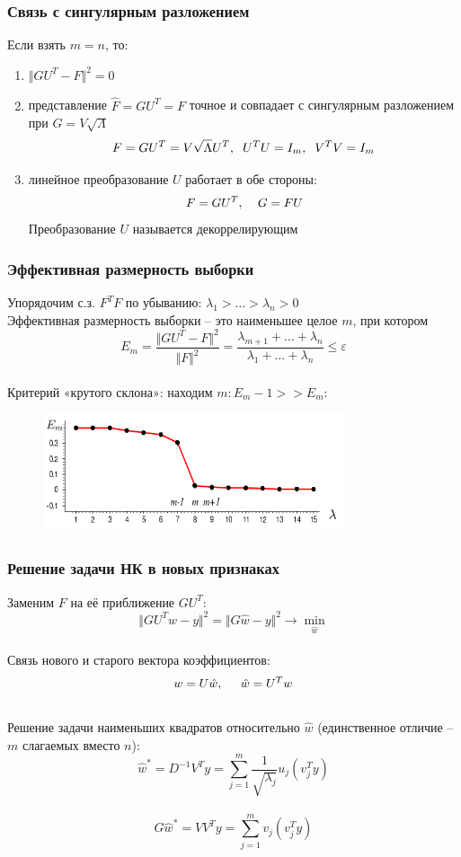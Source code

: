 \documentclass[12pt]{beamer}
\begin{document}
\begin{frame}\frametitle{Связь с сингулярным разложением}
Если взять $m = n$, то:\\
\begin{enumerate}[--]
\item $\Vert GU^T - F \Vert^2 = 0$
\item представление $\hat{F} = GU^T = F$ точное и совпадает с сингулярным разложением при $G = V \sqrt{\Lambda}$
$$F = GU^T = V\sqrt{\Lambda}U^T, \hspace{2mm} U^TU = I_m, \hspace{2mm} V^TV = I_m$$
\item линейное преобразование $U$ работает в обе стороны:\\
$$F= GU^T, \hspace{4mm} G=FU$$
Преобразование $U$ называется декоррелирующим
\end{enumerate}
\end{frame}

\begin{frame}\frametitle{Эффективная размерность выборки}
Упорядочим с.з. $F^TF$ по убыванию: $\lambda_1 > \dots > \lambda_n > 0$\\
Эффективная размерность выборки -- это наименьшее целое $m$, при котором\\
$$E_m = \frac{\Vert GU^T - F \Vert^2}{\Vert F \Vert^2} = \frac{\lambda_{m+1} + \dots + \lambda_{n}}{\lambda_1 + \dots + \lambda_n} \leq \varepsilon$$\\
Критерий «крутого склона»: находим $m: E_m-1 >> E_m$:
\begin{figure}[htbp]
  \includegraphics[height=100pt, keepaspectratio = true]{images/edge}   
\end{figure}
\end{frame}

\begin{frame}\frametitle{Решение задачи НК в новых признаках}
Заменим $F$ на её приближение $GU^T$:\\
$$\Vert GU^Tw -y \Vert^2 = \Vert G\hat{w} -y \Vert^2 \rightarrow \min\limits_{\hat{w}}$$\\
Связь нового и старого вектора коэффициентов:\\
$$w = U\hat{w}, \hspace{5mm} \hat{w} = U^T w$$\\
Решение задачи наименьших квадратов относительно $\hat{w}$ (единственное отличие -- $m$ слагаемых вместо $n$):\\
$$\hat{w}^* = D^{-1}V^Ty = \sum\limits_{j=1}^m \frac{1}{\sqrt{\lambda_j}} u_j (v_j^Ty)$$\\
$$G\hat{w}^* = VV^Ty = \sum\limits_{j=1}^m v_j (v_j^Ty)$$
\end{frame}
\end{document}
